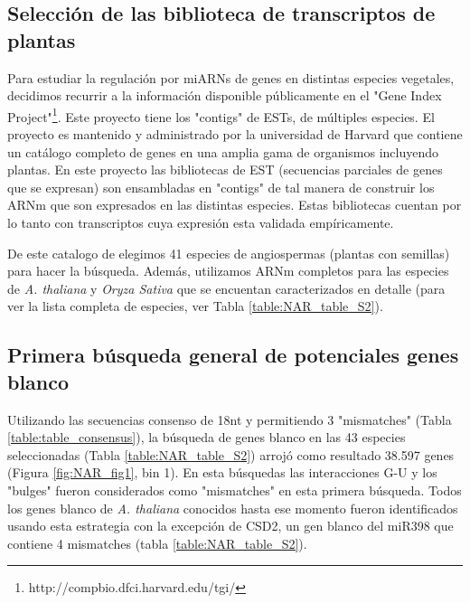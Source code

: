 \subsection{Selección de las biblioteca de transcriptos de plantas}

Para estudiar la regulación por miARNs de genes en distintas especies vegetales, decidimos recurrir a la información disponible públicamente en el "Gene Index Project"\footnote{http://compbio.dfci.harvard.edu/tgi/}.
Este proyecto tiene los "contigs" de ESTs, de múltiples especies.
El proyecto es mantenido y administrado por la universidad de Harvard que contiene un catálogo completo de genes en una amplia gama de organismos incluyendo plantas.
En este proyecto las bibliotecas de EST (secuencias parciales de genes que se expresan) son ensambladas en "contigs" de tal manera de construir los ARNm que son expresados en las distintas especies.
Estas bibliotecas cuentan por lo tanto con transcriptos cuya expresión esta validada empíricamente.

De este catalogo de elegimos 41 especies de angiospermas (plantas con semillas) para hacer la búsqueda.
Además, utilizamos ARNm completos para las especies de \textit{A. thaliana} y \textit{Oryza Sativa}  que se encuentan caracterizados en detalle (para ver la lista completa de especies, ver Tabla \ref{table:NAR_table_S2}).

\subsection{Primera búsqueda general de potenciales genes blanco}
Utilizando las secuencias consenso de 18nt y permitiendo 3 "mismatches" (Tabla \ref{table:table_consensus}), la búsqueda de genes blanco en las 43 especies seleccionadas (Tabla \ref{table:NAR_table_S2}) arrojó como resultado 38.597 genes (Figura \ref{fig:NAR_fig1}, bin 1).
En esta búsquedas las interacciones G-U y los "bulges" fueron considerados como "mismatches" en esta primera búsqueda.
Todos los genes blanco de  \textit{A. thaliana} conocidos hasta ese momento fueron identificados usando esta estrategia con la excepción de CSD2, un gen blanco del miR398 que contiene 4 mismatches (tabla \ref{table:NAR_table_S2}).


